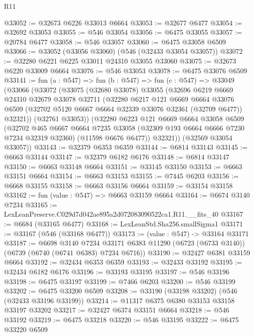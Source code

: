 \begin{lexlean}{R11}
\begin{coremodule}
@33052 := @32673 @6226 @33013 @6664
@33053 := @32677 @6477
@33054 := @32692 @33053
@33055 := @546 @33054
@33056 := @6475 @33055
@33057 := @20784 @6477
@33058 := @546 @33057
@33060 := @6475 @33058 @6509
@33066 := @33052 (@33056 @33060) (@546 (@32433 @33054 @33057))
@33072 := @32280 @6221 @6225 @33011 @24310 @33055 @33060
@33075 := @32673 @6220 @33009 @6664
@33076 := @546 @33053
@33078 := @6475 @33076 @6509
@33141 := fun (a : @547) =>
  fun (b : @547) =>
  fun (c : @547) =>
  @33049
    (@33066
      (@33072
        (@33075
          (@32680 @33078)
          @33055
          (@32696
            @6219
            @6669
            @24310
            @32679
            @33078
            @32711
            (@32280
              @6217
              @121
              @6669
              @6664
              @33076
              @6509
              (@32702 @5120 @6667 @6664 @32339 @33076 @32361 (@32709 @6477))
              @32321))
          (@32761 @33053))
        (@32280
          @6223
          @121
          @6669
          @6664
          @33058
          @6509
          (@32702
            @465
            @6667
            @6664
            @7235
            @33058
            (@32309 @193 @6664 @6666 @7230 @7234 @32319 @32360)
            (@11598 @6676 @6477))
          @32321))
      (@32569 @33054 @33057))
@33143 := @32379 @6353 @6359
@33144 := @6814 @33143
@33145 := @6663 @33144
@33147 := @32379 @6182 @6176
@33148 := @6814 @33147
@33150 := @6663 @33148 @6664
@33151 := @33145 @33150
@33153 := @6663 @33151 @6664
@33154 := @6663 @33153
@33155 := @7445 @6203
@33156 := @6668 @33155
@33158 := @6663 @33156 @6664
@33159 := @33154 @33158
@33162 := fun (value : @547) => @6663 @33159 @6664
@33164 := @6674 @3140 @7234
@33165 := LexLeanPreserve.C029d7d042ae895a2d072083090522ca1.R11.__fits_40
@33167 := @6684 (@33165 @6477)
@33168 := LexLeanStd.Sha256.smallSigma1
@33171 := @33167 (@546 (@33168 @6477))
@33173 := (value : @547) -> @33164 @33171
@33187 := @6698
    @3140
    @7234
    @33171
    @6383
    @11290
    (@6723 (@6733 @3140))
    (@6739 (@6740 (@6741 @6383) @7234 @6716))
@33190 := @32427 @6381 @33159 @6664
@33192 := @32434 @6353 @6359
@33193 := @32433 @33192
@33195 := @32434 @6182 @6176
@33196 := @33193 @33195
@33197 := @546 @33196
@33198 := @6475 @33197
@33199 := @7466 @6203
@33200 := @546 @33199
@33202 := @6475 @33200 @6509
@33208 := @33190 (@33198 @33202) (@546 (@32433 @33196 @33199))
@33214 := @11317 @6375 @6380 @33153 @33158 @33197 @33202
@33217 := @32427 @6374 @33151 @6664
@33218 := @546 @33192
@33219 := @6475 @33218
@33220 := @546 @33195
@33222 := @6475 @33220 @6509

\end{coremodule}
\end{lexlean}
